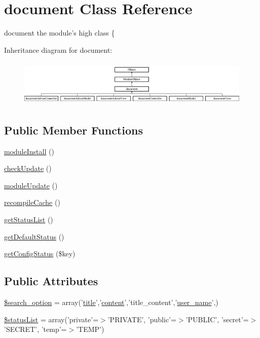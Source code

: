 \hypertarget{classdocument}{\section{document Class Reference}
\label{classdocument}
}


document the module's high class \{  


Inheritance diagram for document\+:\begin{figure}[H]
\begin{center}
\leavevmode
\includegraphics[height=2.262626cm]{classdocument}
\end{center}
\end{figure}
\subsection*{Public Member Functions}
\begin{DoxyCompactItemize}
\item 
\hyperlink{classdocument_a712db6c7542d0ec2cfdde35583a3b7ba}{module\+Install} ()
\item 
\hyperlink{classdocument_a71d01592758989490b56cbd6a2a92e37}{check\+Update} ()
\item 
\hyperlink{classdocument_ad0568fe26b80e3bc328a3fae4997354c}{module\+Update} ()
\item 
\hyperlink{classdocument_ae08854265fa7f6cb8b792d5c1ab93dc2}{recompile\+Cache} ()
\item 
\hyperlink{classdocument_ae90cc64e28afdfa204844ed6d03b40e7}{get\+Status\+List} ()
\item 
\hyperlink{classdocument_aacc6b168cae9bf79d7a13d6f5bb4fdfb}{get\+Default\+Status} ()
\item 
\hyperlink{classdocument_a319eeb35de3ffef5cb32374283b7bf14}{get\+Config\+Status} (\$key)
\end{DoxyCompactItemize}
\subsection*{Public Attributes}
\begin{DoxyCompactItemize}
\item 
\hyperlink{classdocument_adfef00d8f028ef4dfe991de199009d46}{\$search\+\_\+option} = array('\hyperlink{ko_8install_8php_a5b072c5fd1d2228c6ba5cee13cd142e3}{title}','\hyperlink{classcontent}{content}','title\+\_\+content','\hyperlink{ko_8install_8php_a115401aff7da80e73c66e9f76505426b}{user\+\_\+name}',)
\item 
\hyperlink{classdocument_a93e1c85a4ec17a1471b874fdb14cce58}{\$status\+List} = array('private'=$>$'P\+R\+I\+V\+A\+T\+E', 'public'=$>$'P\+U\+B\+L\+I\+C', 'secret'=$>$'S\+E\+C\+R\+E\+T', 'temp'=$>$'T\+E\+M\+P')
\end{DoxyCompactItemize}


